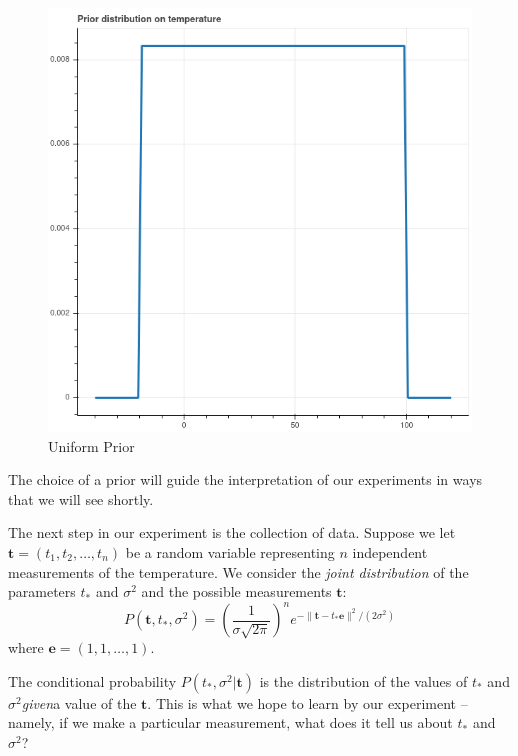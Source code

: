 \documentclass[
  11pt,
  letterpaper,
]{scrbook}
\theoremstyle{plain}
\theoremstyle{plain}
\theoremstyle{remark}
\begin{document}
\begin{figure}

{\centering \includegraphics{chapters/img/uniform.png}

}

\caption{\label{fig-uniformprior}Uniform Prior}

\end{figure}

The choice of a prior will guide the interpretation of our experiments
in ways that we will see shortly.

The next step in our experiment is the collection of data. Suppose we
let \(\mathbf{t}=(t_1,t_2,\ldots, t_n)\) be a random variable
representing \(n\) independent measurements of the temperature. We
consider the \emph{joint distribution} of the parameters \(t_*\) and
\(\sigma^2\) and the possible measurements \(\mathbf{t}\): \[
P(\mathbf{t},t_*,\sigma^2)=\left(\frac{1}{\sigma\sqrt{2\pi}}\right)^{n}e^{-\|\mathbf{t}-t_*\mathbf{e}\|^2/(2\sigma^2)}
\] where \(\mathbf{e}=(1,1,\ldots, 1)\).

The conditional probability \(P(t_{*},\sigma^2|\mathbf{t})\) is the
distribution of the values of \(t_*\) and \(\sigma^2\)\emph{given}a
value of the \(\mathbf{t}\). This is what we hope to learn by our
experiment -- namely, if we make a particular measurement, what does it
tell us about \(t_*\) and \(\sigma^2\)?
\end{document}
